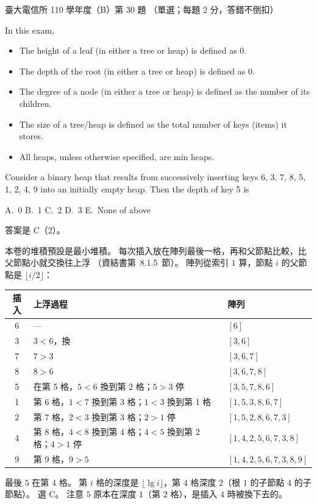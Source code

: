 \begin{pastexam}[label={px:ntu-110-comm-dsa-30}]{臺大電信所 110 學年度（B）第 30 題}
（單選；每題 2 分，答錯不倒扣）

In this exam,
\begin{itemize}
\item The height of a leaf (in either a tree or heap) is defined as 0.
\item The depth of the root (in either a tree or heap) is defined as 0.
\item The degree of a node (in either a tree or heap) is defined as the number of its children.
\item The size of a tree/heap is defined as the total number of keys (items) it stores.
\item All heaps, unless otherwise specified, are min heaps.
\end{itemize}

Consider a binary heap that results from successively inserting keys 6, 3, 7, 8, 5, 1, 2, 4, 9 into an initially empty heap. Then the depth of key 5 is

A.~0 \qquad B.~1 \qquad C.~2 \qquad D.~3 \qquad E.~None of above
\end{pastexam}

\begin{pastsoln}
答案是 C（2）。

本卷的堆積預設是最小堆積。 每次插入放在陣列最後一格，再和父節點比較，比父節點小就交換往上浮
（資結書第~8.1.5~節）。 陣列從索引 $1$ 算，節點 $i$ 的父節點是 $\lfloor i/2\rfloor$：
\begin{center}
\begin{tabular}{cll}
\toprule
插入 & 上浮過程 & 陣列 \\
\midrule
6 & — & $[6]$ \\
3 & $3 < 6$，換 & $[3, 6]$ \\
7 & $7 > 3$ & $[3, 6, 7]$ \\
8 & $8 > 6$ & $[3, 6, 7, 8]$ \\
5 & 在第 5 格，$5 < 6$ 換到第 2 格；$5 > 3$ 停 & $[3, 5, 7, 8, 6]$ \\
1 & 第 6 格，$1 < 7$ 換到第 3 格；$1 < 3$ 換到第 1 格 & $[1, 5, 3, 8, 6, 7]$ \\
2 & 第 7 格，$2 < 3$ 換到第 3 格；$2 > 1$ 停 & $[1, 5, 2, 8, 6, 7, 3]$ \\
4 & 第 8 格，$4 < 8$ 換到第 4 格；$4 < 5$ 換到第 2 格；$4 > 1$ 停 & $[1, 4, 2, 5, 6, 7, 3, 8]$ \\
9 & 第 9 格，$9 > 5$ & $[1, 4, 2, 5, 6, 7, 3, 8, 9]$ \\
\bottomrule
\end{tabular}
\end{center}
最後 $5$ 在第 $4$ 格。 第 $i$ 格的深度是 $\lfloor\lg i\rfloor$，第 $4$ 格深度 $2$（根 $1$ 的子節點 $4$ 的子節點）。
選 C。 注意 $5$ 原本在深度 $1$（第 $2$ 格），是插入 $4$ 時被換下去的。
\end{pastsoln}
